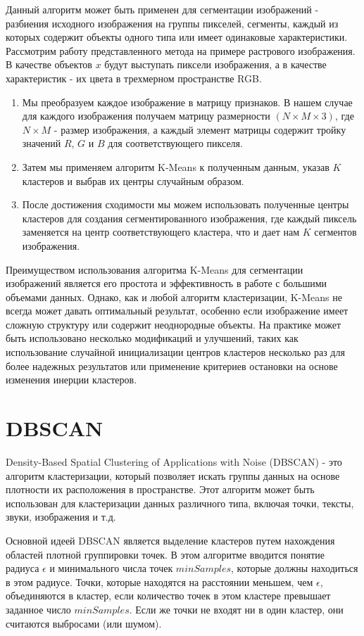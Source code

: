 \documentclass{article}
\begin{document}
Данный алгоритм может быть применен для сегментации изображений - разбиения исходного изображения на группы пикселей, сегменты, каждый из которых содержит объекты одного типа или имеет одинаковые характеристики.
Рассмотрим работу представленного метода на примере растрового изображения. В качестве объектов $x$ будут выступать пиксели изображения, а в качестве характеристик - их цвета в трехмерном пространстве RGB. 

\begin{enumerate}
\item Мы преобразуем каждое изображение в матрицу признаков. В нашем случае для каждого изображения получаем матрицу размерности $(N \times M \times 3)$, где $N\times M$ - размер изображения, а каждый элемент матрицы содержит тройку значений $R$, $G$ и $B$ для соответствующего пикселя.
\item Затем мы применяем алгоритм K-Means к полученным данным, указав $K$ кластеров и выбрав их центры случайным образом.
\item После достижения сходимости мы можем использовать полученные центры кластеров для создания сегментированного изображения, где каждый пиксель заменяется на центр соответствующего кластера, что и дает нам $K$ сегментов изображения.
\end{enumerate}

Преимуществом использования алгоритма K-Means для сегментации изображений является его простота и эффективность в работе с большими объемами данных. Однако, как и любой алгоритм кластеризации, K-Means не всегда может давать оптимальный результат, особенно если изображение имеет сложную структуру или содержит неоднородные объекты. На практике может быть использовано несколько модификаций и улучшений, таких как использование случайной инициализации центров кластеров несколько раз для более надежных результатов или применение критериев остановки на основе изменения инерции кластеров.


\section{DBSCAN}

Density-Based Spatial Clustering of Applications with Noise (DBSCAN) - это алгоритм кластеризации, который позволяет искать группы данных на основе плотности их расположения в пространстве. Этот алгоритм может быть использован для кластеризации данных различного типа, включая точки, тексты, звуки, изображения и т.д.

Основной идеей DBSCAN является выделение кластеров путем нахождения областей плотной группировки точек. В этом алгоритме вводится понятие радиуса $\epsilon$ и минимального числа точек $minSamples$, которые должны находиться в этом радиусе. Точки, которые находятся на расстоянии меньшем, чем $\epsilon$, объединяются в кластер, если количество точек в этом кластере превышает заданное число $minSamples$. Если же точки не входят ни в один кластер, они считаются выбросами (или шумом).
\end{document}
